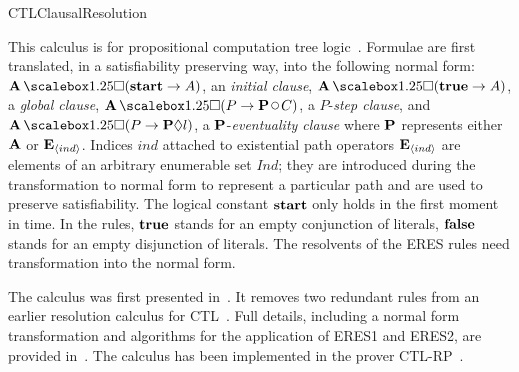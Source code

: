 \begin{entry}{CTLClausalResolution}
 \begin{clarifications}
This calculus is for propositional computation tree
logic~\cite{Clarke+Emerson@LP1981}.
Formulae are first translated, in a satisfiability preserving way,
into the following normal form: 
$\allpaths \Always (\lstart \rightarrow A)$, an \emph{initial clause},
$\allpaths  \Always (\ltrue \rightarrow A)$, a \emph{global clause},
$\allpaths \Always (P \rightarrow  \eitherpath \Next C)$,  
a $P$-\emph{step clause}, and
$\allpaths  \Always  (P   \rightarrow  \eitherpath \Eventually l)$,
a $\mathbf{P}$-\emph{eventuality clause} 
where $\mathbf{P}$ represents  either $\mathbf A$ or $\mathbf{E}_{\langle ind \rangle}$.
%
Indices $\mathit{ind}$ attached to existential path operators 
$\mathbf{E}_{\langle ind \rangle}$ are elements of an arbitrary enumerable set
$\mathit{Ind}$; they are introduced during the transformation to normal
form to represent a particular path and are used to
preserve satisfiability.
% 
The logical constant ${\mathbf{start}}$ only holds in the first moment in time. 
%
%
In the rules, ${\mathbf{true}}$ stands for an empty conjunction of literals,  
${\mathbf{false}}$ stands for an empty disjunction of literals.
The resolvents of the ERES rules need transformation
into the normal form. 
%
\end{clarifications}

\begin{history}
The calculus was first presented
in~\cite{Zhang+Hustadt+Dixon@CADE2009}.
It removes two redundant rules from an earlier resolution calculus for
CTL~\cite{BF99:jetai}.
Full details, including a normal form transformation and algorithms
for the application of ERES1 and ERES2, are provided in~\cite{Zhang+Hustadt+Dixon@ToCL2014}. 
The calculus has been implemented in the prover
CTL-RP~\cite{Zhang+Hustadt+Dixon@AIC2010}. 
\end{history}


\end{entry}
